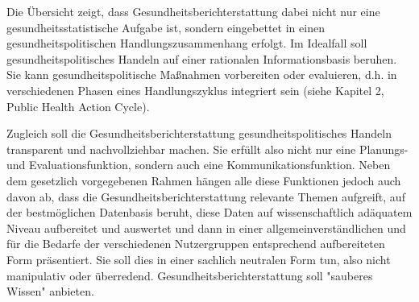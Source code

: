 \documentclass{article}
\begin{document}
Die Übersicht zeigt, dass Gesundheitsberichterstattung dabei nicht nur eine gesundheitsstatistische Aufgabe ist, sondern eingebettet in einen gesundheitspolitischen Handlungszusammenhang erfolgt. Im Idealfall soll gesundheitspolitisches Handeln auf einer rationalen Informationsbasis beruhen. Sie kann gesundheitspolitische Maßnahmen vorbereiten oder evaluieren, d.h. in verschiedenen Phasen eines Handlungszyklus integriert sein (siehe Kapitel 2, Public Health Action Cycle).


Zugleich soll die Gesundheitsberichterstattung gesundheitspolitisches Handeln transparent und nachvollziehbar machen. Sie erfüllt also nicht nur eine Planungs- und Evaluationsfunktion, sondern auch eine Kommunikationsfunktion. Neben dem gesetzlich vorgegebenen Rahmen hängen alle diese Funktionen jedoch auch davon ab, dass die Gesundheitsberichterstattung relevante Themen aufgreift, auf der bestmöglichen Datenbasis beruht, diese Daten auf wissenschaftlich adäquatem Niveau aufbereitet und auswertet und dann in einer allgemeinverständlichen und für die Bedarfe der verschiedenen Nutzergruppen entsprechend aufbereiteten Form präsentiert. Sie soll dies in einer sachlich neutralen Form tun, also nicht manipulativ oder überredend. Gesundheitsberichterstattung soll "sauberes Wissen" anbieten.
\end{document}
